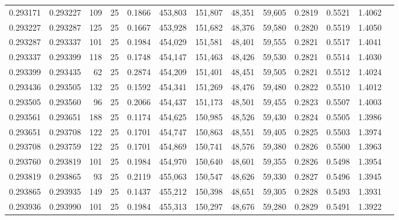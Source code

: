 \begin{tabular}{rrrrrrrrrrrrr}
0.293171 & 0.293227 &   109 &  25 &                                     0.1866 & 453,803 & 151,807 &  48,351 &  59,605 & 0.2819 & 0.5521 & 1.4062 \\
0.293227 & 0.293287 &   125 &  25 &                                     0.1667 & 453,928 & 151,682 &  48,376 &  59,580 & 0.2820 & 0.5519 & 1.4050 \\
0.293287 & 0.293337 &   101 &  25 &                                     0.1984 & 454,029 & 151,581 &  48,401 &  59,555 & 0.2821 & 0.5517 & 1.4041 \\
0.293337 & 0.293399 &   118 &  25 &                                     0.1748 & 454,147 & 151,463 &  48,426 &  59,530 & 0.2821 & 0.5514 & 1.4030 \\
0.293399 & 0.293435 &    62 &  25 &                                     0.2874 & 454,209 & 151,401 &  48,451 &  59,505 & 0.2821 & 0.5512 & 1.4024 \\
0.293436 & 0.293505 &   132 &  25 &                                     0.1592 & 454,341 & 151,269 &  48,476 &  59,480 & 0.2822 & 0.5510 & 1.4012 \\
0.293505 & 0.293560 &    96 &  25 &                                     0.2066 & 454,437 & 151,173 &  48,501 &  59,455 & 0.2823 & 0.5507 & 1.4003 \\
0.293561 & 0.293651 &   188 &  25 &                                     0.1174 & 454,625 & 150,985 &  48,526 &  59,430 & 0.2824 & 0.5505 & 1.3986 \\
0.293651 & 0.293708 &   122 &  25 &                                     0.1701 & 454,747 & 150,863 &  48,551 &  59,405 & 0.2825 & 0.5503 & 1.3974 \\
0.293708 & 0.293759 &   122 &  25 &                                     0.1701 & 454,869 & 150,741 &  48,576 &  59,380 & 0.2826 & 0.5500 & 1.3963 \\
0.293760 & 0.293819 &   101 &  25 &                                     0.1984 & 454,970 & 150,640 &  48,601 &  59,355 & 0.2826 & 0.5498 & 1.3954 \\
0.293819 & 0.293865 &    93 &  25 &                                     0.2119 & 455,063 & 150,547 &  48,626 &  59,330 & 0.2827 & 0.5496 & 1.3945 \\
0.293865 & 0.293935 &   149 &  25 &                                     0.1437 & 455,212 & 150,398 &  48,651 &  59,305 & 0.2828 & 0.5493 & 1.3931 \\
0.293936 & 0.293990 &   101 &  25 &                                     0.1984 & 455,313 & 150,297 &  48,676 &  59,280 & 0.2829 & 0.5491 & 1.3922 \\

\end{tabular}
